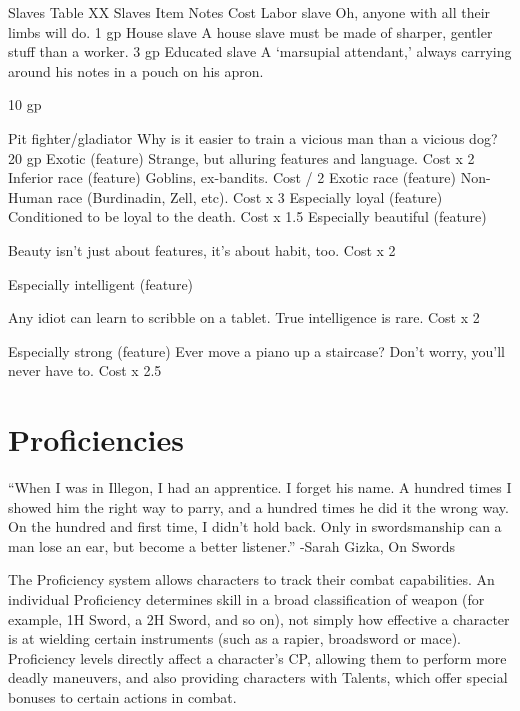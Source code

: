 \documentclass[oneside,11pt,english]{book}
\begin{document}
 


Slaves 
Table XX Slaves 
Item Notes Cost 
Labor slave Oh, anyone with all their limbs will do. 1 gp 
House slave A house slave must be made of sharper, gentler stuff than a worker. 3 gp 
Educated slave A ‘marsupial attendant,’ always carrying around his notes in a pouch on 
his apron. 

10 gp 

Pit fighter/gladiator Why is it easier to train a vicious man than a vicious dog? 20 gp 
Exotic (feature) Strange, but alluring features and language. Cost x 2 
Inferior race (feature) Goblins, ex-bandits. Cost / 2 
Exotic race (feature) Non-Human race (Burdinadin, Zell, etc). Cost x 3 
Especially loyal (feature) Conditioned to be loyal to the death. Cost x 
1.5 
Especially beautiful 
(feature) 

Beauty isn’t just about features, it’s about habit, too. Cost x 2 

Especially intelligent 
(feature) 

Any idiot can learn to scribble on a tablet. True intelligence is rare. Cost x 2 

Especially strong (feature) Ever move a piano up a staircase? Don’t worry, you’ll never have to. Cost x 
2.5 

 

 

\chapter{Proficiencies}\label{ch:proficiencies}
\startcontents[chapters]
\clearpage
 

“When I was in Illegon, I had an apprentice. I forget his name. A hundred times I showed him the right way to parry, and a 
hundred times he did it the wrong way. On the hundred and first time, I didn’t hold back. Only in swordsmanship can a man lose 
an ear, but become a better listener.” 
-Sarah Gizka, On Swords 
 

 

The Proficiency system allows characters to track their combat capabilities. An individual Proficiency 
determines skill in a broad classification of weapon (for example, 1H Sword, a 2H Sword, and so on), not 
simply how effective a character is at wielding certain instruments (such as a rapier, broadsword or 
mace). Proficiency levels directly affect a character’s CP, allowing them to perform more deadly 
maneuvers, and also providing characters with Talents, which offer special bonuses to certain actions in 
combat. 
\end{document}
